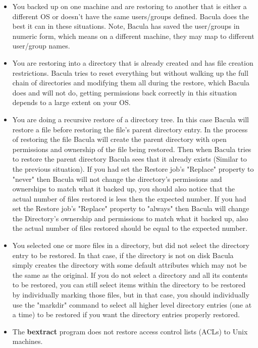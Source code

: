 \begin{itemize}
\item You backed up on one machine and are restoring to another that is 
   either a different OS or doesn't have the same users/groups defined.  Bacula
   does the best it can in these situations. Note, Bacula has saved the
   user/groups in numeric form, which means on a different machine, they
   may map to different user/group names.

\item You are restoring into a directory that is already created and has
   file creation restrictions.  Bacula tries to reset everything but
   without walking up the full chain of directories and modifying them all
   during the restore, which Bacula does and will not do, getting
   permissions back correctly in this situation depends to a large extent
   on your OS.

\item You are doing a recursive restore of a directory tree.  In this case
   Bacula will restore a file before restoring the file's parent directory
   entry.  In the process of restoring the file Bacula will create the
   parent directory with open permissions and ownership of the file being
   restored.  Then when Bacula tries to restore the parent directory Bacula
   sees that it already exists (Similar to the previous situation).  If you
   had set the Restore job's "Replace" property to "never" then Bacula will
   not change the directory's permissions and ownerships to match what it
   backed up, you should also notice that the actual number of files
   restored is less then the expected number.  If you had set the Restore
   job's "Replace" property to "always" then Bacula will change the
   Directory's ownership and permissions to match what it backed up, also
   the actual number of files restored should be equal to the expected
   number.

\item You selected one or more files in a directory, but did not select the
   directory entry to be restored.  In that case, if the directory is not
   on disk Bacula simply creates the directory with some default attributes
   which may not be the same as the original.  If you do not select a
   directory and all its contents to be restored, you can still select
   items within the directory to be restored by individually marking those
   files, but in that case, you should individually use the "markdir"
   command to select all higher level directory entries (one at a time) to
   be restored if you want the directory entries properly restored.

\item The {\bf bextract} program does not restore access control lists
  (ACLs) to Unix machines.
\end{itemize}

